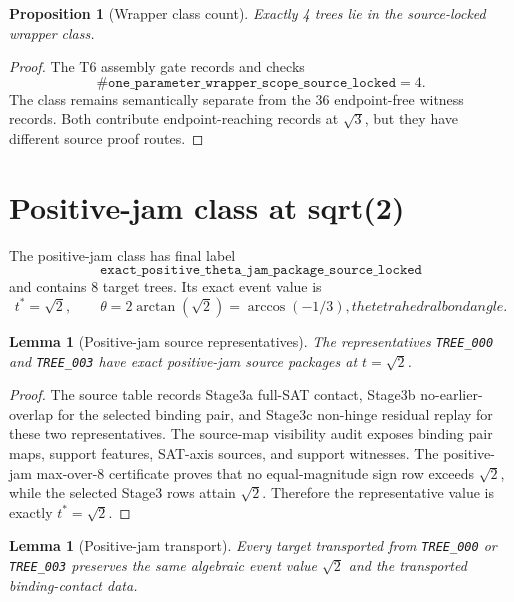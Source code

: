 \documentclass[11pt,a4paper]{article}
\newtheorem{proposition}[theorem]{Proposition}
\newtheorem{lemma}[theorem]{Lemma}
\theoremstyle{definition}
\theoremstyle{remark}
\begin{document}
\begin{proposition}[Wrapper class count]
Exactly 4 trees lie in the source-locked wrapper class.
\end{proposition}

\begin{proof}
The T6 assembly gate records and checks
\[
  \#\texttt{one\_parameter\_wrapper\_scope\_source\_locked}=4.
\]
The class remains semantically separate from the 36 endpoint-free witness records.  Both contribute endpoint-reaching records at \(\sqrt{3}\), but they have different source proof routes.
\end{proof}



\section{Positive-jam class at sqrt(2)}

The positive-jam class has final label
\[
  \texttt{exact\_positive\_theta\_jam\_package\_source\_locked}
\]
and contains 8 target trees.  Its exact event value is
\[
  t^* = \sqrt{2}, \qquad \theta = 2\arctan(\sqrt{2}) = \arccos(-1/3), the tetrahedral bond angle.
\]

\begin{lemma}[Positive-jam source representatives]
The representatives \texttt{TREE\_000} and \texttt{TREE\_003} have exact positive-jam source packages at \(t=\sqrt{2}\).
\end{lemma}

\begin{proof}
The source table records Stage3a full-SAT contact, Stage3b no-earlier-overlap for the selected binding pair, and Stage3c non-hinge residual replay for these two representatives.  The source-map visibility audit exposes binding pair maps, support features, SAT-axis sources, and support witnesses.  The positive-jam max-over-8 certificate proves that no equal-magnitude sign row exceeds \(\sqrt{2}\), while the selected Stage3 rows attain \(\sqrt{2}\).  Therefore the representative value is exactly \(t^*=\sqrt{2}\).
\end{proof}

\begin{lemma}[Positive-jam transport]
Every target transported from \texttt{TREE\_000} or \texttt{TREE\_003} preserves the same algebraic event value \(\sqrt{2}\) and the transported binding-contact data.
\end{lemma}
\end{document}
